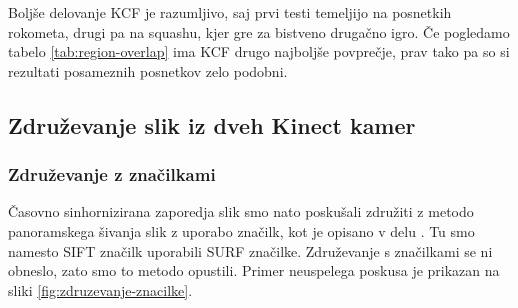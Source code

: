 Boljše delovanje KCF je razumljivo, saj prvi testi temeljijo na posnetkih rokometa, drugi pa na squashu, kjer gre za bistveno drugačno igro. Če pogledamo tabelo \ref{tab:region-overlap} ima KCF drugo najboljše povprečje, prav tako pa so si rezultati posameznih posnetkov zelo podobni. 









\subsection{Združevanje slik iz dveh Kinect kamer}\label{sec:zdruzevanje}
\subsubsection{Združevanje z značilkami}
Časovno sinhornizirana zaporedja slik smo nato poskušali združiti z metodo panoramskega šivanja slik z uporabo značilk, kot je opisano v delu \cite{brown2007automatic}. Tu smo namesto SIFT značilk uporabili SURF značilke.
Združevanje s značilkami se ni obneslo, zato smo to metodo opustili. Primer neuspelega poskusa je prikazan na sliki \ref{fig:zdruzevanje-znacilke}.

